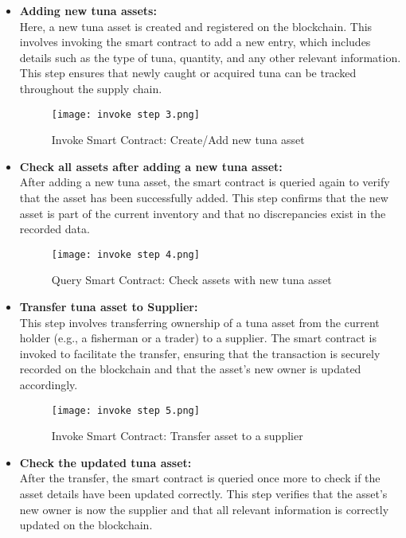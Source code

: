 	\begin{itemize}
	\item \textbf{Adding new tuna assets:}\\
	Here, a new tuna asset is created and registered on the blockchain. This involves invoking the smart contract to add a new entry, which includes details such as the type of tuna, quantity, and any other relevant information. This step ensures that newly caught or acquired tuna can be tracked throughout the supply chain.
	
	\begin{figure}[H]
		\centering
		\texttt{[image: invoke step 3.png]}
		\caption{Invoke Smart Contract: Create/Add new tuna asset}
		\label{fig: third step}
	\end{figure}
	
	\item \textbf{Check all assets after adding a new tuna asset:}\\
	After adding a new tuna asset, the smart contract is queried again to verify that the asset has been successfully added. This step confirms that the new asset is part of the current inventory and that no discrepancies exist in the recorded data.
	
	\begin{figure}[H]
		\centering
		\texttt{[image: invoke step 4.png]}
		\caption{Query Smart Contract: Check assets with new tuna asset}
		\label{fig: fourth step}
	\end{figure}
	
	\item \textbf{Transfer tuna asset to Supplier:}\\
	This step involves transferring ownership of a tuna asset from the current holder (e.g., a fisherman or a trader) to a supplier. The smart contract is invoked to facilitate the transfer, ensuring that the transaction is securely recorded on the blockchain and that the asset’s new owner is updated accordingly.
	
	\begin{figure}[H]
		\centering
		\texttt{[image: invoke step 5.png]}
		\caption{Invoke Smart Contract: Transfer asset to a supplier}
		\label{fig: fifth step}
	\end{figure}
	
	\item \textbf{Check the updated tuna asset:}\\
	After the transfer, the smart contract is queried once more to check if the asset details have been updated correctly. This step verifies that the asset’s new owner is now the supplier and that all relevant information is correctly updated on the blockchain.
	

\end{itemize}
